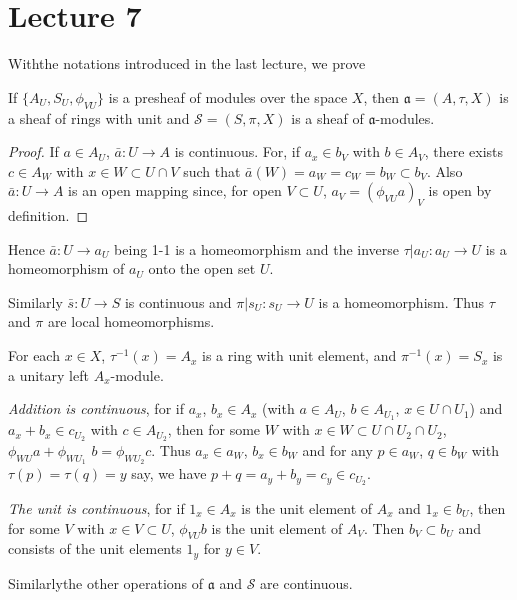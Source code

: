 \chapter{Lecture 7}

With\pageoriginale the notations introduced in the last lecture, we prove

\begin{proposition}%
 If $\{A_U, S_U, \phi_{VU}\}$ is a presheaf of modules over the
  space $X$, then $\mathfrak{a} = (A, \tau, X)$ is a sheaf of rings
  with unit and $\mathscr{S}= (S, \pi, X)$ is a sheaf of
  $\mathfrak{a}$-modules.  
\end{proposition}

\begin{proof}
If $a \in A_U$, $\bar{a}: U \to A$ is continuous. For, if $a_x \in b_V$
with $b \in A_V$, there exists $c \in A_W$ with $x \in W \subset  U
\cap V $ such that $\bar{a}(W)=a_W =c_W =b_W \subset b_V$. Also
$\bar{a}: U \to A$ is an open mapping since, for open $V \subset U$,
$a_V = (\phi_{VU}a)_V$ is open by definition. 
\end{proof}

\noindent
Hence $\bar{a}: U \to a_U$ being 1-1 is a homeomorphism and the
inverse $\tau | a_U : a_U \to U$ is a homeomorphism of $a_U$ onto the
open set $U$. 

Similarly $\bar{s} : U \to S$ is continuous and $\pi | s_U: s_U \to U$
is a homeomorphism. Thus $\tau $ and $\pi$ are local homeomorphisms. 

For each $x \in X$, $\tau^{-1}(x)=A_x$ is a ring with unit element, and
$\pi^{-1}(x)= S_x$ is a unitary left $A_x$-module. 

\textit{Addition is continuous}, for if $a_x$, $b_x \in A_x$ (with $a
\in A_U$, $b \in A_{U_1}$, $x \in U \cap U_1$) and $a_x + b_x \in c_{U_2}$
with $c \in A_{U_2}$, then for some $W$ with $x \in W \subset U \cap
U_2 \cap U_2$, $\phi_{WU} a+ \phi_{WU_1}$  $b=\phi_{WU_2} c$. Thus $a_x \in
a_W$, $b_x \in b_W$ and for any $p \in a_W$, $q\in b_W$ with $\tau(p)=
\tau (q)= y$ say, we have $p+q = a_y +b_y = c_y \in c_{U_2}$. 

\textit{The unit is continuous}, for if $1_x \in A_x$ is the unit
element of $A_x$ and $1_x \in b_U$, then for some $V$ with $x \in V
\subset U$, $\phi_{VU}b$ is the unit element of $A_V$. Then $b_V \subset
b_U$ and consists of the unit elements $1_y$ for
$y \in V$. 

Similarly\pageoriginale the other operations of $\mathfrak{a}$ and
$\mathscr{S}$ are continuous.  

